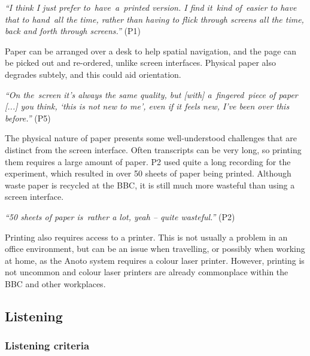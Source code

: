 \textit{``I think I just prefer to have a printed version. I find it kind of easier to have that to hand all the time,
rather than having to flick through screens all the time, back and forth through screens.''} (P1)

Paper can be arranged over a desk to help spatial navigation, and the page can be picked out and re-ordered, unlike
screen interfaces.
Physical paper also degrades subtely, and this could aid orientation.

\textit{``On the screen it's always the same quality, but [with] a fingered piece of paper [...]
you think, `this is not new to me', even if it feels new, I've been over this before.''} (P5)



The physical nature of paper presents some well-understood challenges that are distinct from the screen interface.
Often transcripts can be very long, so printing them requires a large amount of paper. P2 used quite a long recording
for the experiment, which resulted in over 50 sheets of paper being printed. Although waste paper is recycled at the
BBC, it is still much more wasteful than using a screen interface.

\textit{``50 sheets of paper is rather a lot, yeah -- quite wasteful.''} (P2)


Printing also requires access to a printer. This is not usually a problem in an office environment, but can be an issue
when travelling, or possibly when working at home, as the Anoto system requires a colour laser printer. However,
printing is not uncommon and colour laser printers are already commonplace within the BBC and other workplaces.

\subsection{Listening}

\subsubsection{Listening criteria}\label{sec:pen-listening-criteria}


